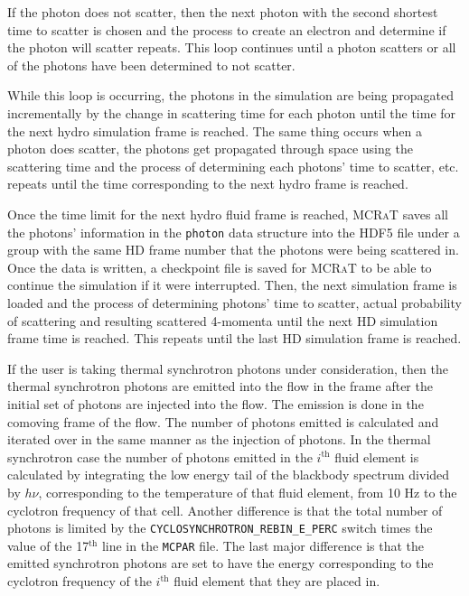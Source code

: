 \documentclass[12pt,a4paper]{article}
\newcommand{\mcrat}{\textsc{MCRaT}}
\begin{document}
If the photon does not scatter, then the next photon with the second shortest time to scatter is chosen and the process to create an electron and determine if the photon will scatter repeats. This loop continues until a photon scatters or all of the photons have been determined to not scatter. 

While this loop is occurring, the photons in the simulation are being propagated incrementally by the change in scattering time for each photon until the time for the next hydro simulation frame is reached. The same thing occurs when a photon does scatter, the photons get propagated through space using the scattering time and the process of determining each photons' time to scatter, etc. repeats until the time corresponding to the next hydro frame is reached.

Once the time limit for the next hydro fluid frame is reached, \mcrat{} saves all the photons' information in the \texttt{photon} data structure into the HDF5 file under a group with the same HD frame number that the photons were being scattered in. Once the data is written, a checkpoint file is saved for \mcrat{} to be able to continue the simulation if it were interrupted. Then, the next simulation frame is loaded and the process of determining photons' time to scatter, actual probability of scattering and resulting scattered 4-momenta until the next HD simulation frame time is reached. This repeats until the last HD simulation frame is reached. 

If the user is taking thermal synchrotron photons under consideration, then the thermal synchrotron photons are emitted into the flow in the frame after the initial set of photons are injected into the flow. The emission is done in the comoving frame of the flow. The number of photons emitted is calculated and iterated over in the same manner as the injection of photons. In the thermal synchrotron case the number of photons emitted in the $i^\mathrm{th}$ fluid element is calculated by integrating the low energy tail of the blackbody spectrum divided by $h\nu$, corresponding to the temperature of that fluid element, from 10 Hz to the cyclotron frequency of that cell. Another difference is that the total number of photons is limited by the \texttt{CYCLOSYNCHROTRON\_REBIN\_E\_PERC} switch times the value of the 17$^\textrm{th}$ line in the \texttt{MCPAR} file. The last major difference is that the emitted synchrotron photons are set to have the energy corresponding to the cyclotron frequency of the $i^\mathrm{th}$ fluid element that they are placed in.
\end{document}
